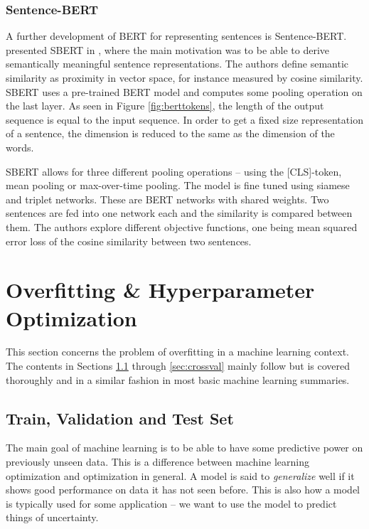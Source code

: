 \subsubsection{Sentence-BERT}

A further development of BERT for representing sentences is Sentence-BERT. \citeauthor{reimers2019sentence} presented SBERT in \citeyear{reimers2019sentence}, where the main motivation was to be able to derive semantically meaningful sentence representations. The authors define semantic similarity as proximity in vector space, for instance measured by cosine similarity. SBERT uses a pre-trained BERT model and computes some pooling operation on the last layer. As seen in Figure \ref{fig:berttokens}, the length of the output sequence is equal to the input sequence. In order to get a fixed size representation of a sentence, the dimension is reduced to the same as the dimension of the words.

SBERT allows for three different pooling operations -- using the \textsc{[CLS]}-token, mean pooling or max-over-time pooling. The model is fine tuned using siamese and triplet networks. These are BERT networks with shared weights. Two sentences are fed into one network each and the similarity is compared between them. The authors explore different objective functions, one being mean squared error loss of the cosine similarity between two sentences. 


\section{Overfitting \& Hyperparameter Optimization}

This section concerns the problem of overfitting in a machine learning context. The contents in Sections \ref{sec:trainvaltest} through \ref{sec:crossval} mainly follow \citeauthor{Goodfellow-et-al-2016} but is covered thoroughly and in a similar fashion in most basic machine learning summaries. 

\subsection{Train, Validation and Test Set}\label{sec:trainvaltest}

The main goal of machine learning is to be able to have some predictive power on previously unseen data. This is a difference between machine learning optimization and optimization in general. A model is said to \emph{generalize} well if it shows good performance on data it has not seen before. This is also how a model is typically used for some application -- we want to use the model to predict things of uncertainty. 

